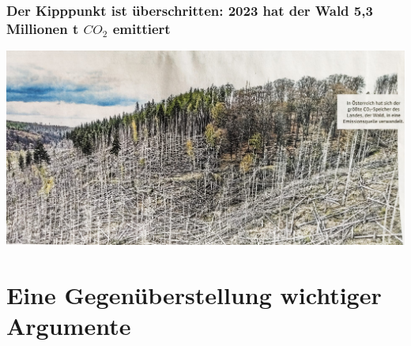 \documentclass[8pt]{beamer}
\begin{document}
	\begin{frame}[t]
		\frametitle{Der Kipppunkt ist überschritten: 2023 hat der Wald 5,3 Millionen t $CO_2$ 	emittiert} 
		
		\vspace{0.8mm}
		\includegraphics[scale=0.18]{wald.jpg}

	\end{frame}


\section{Eine Gegenüberstellung wichtiger Argumente}
\end{document}
